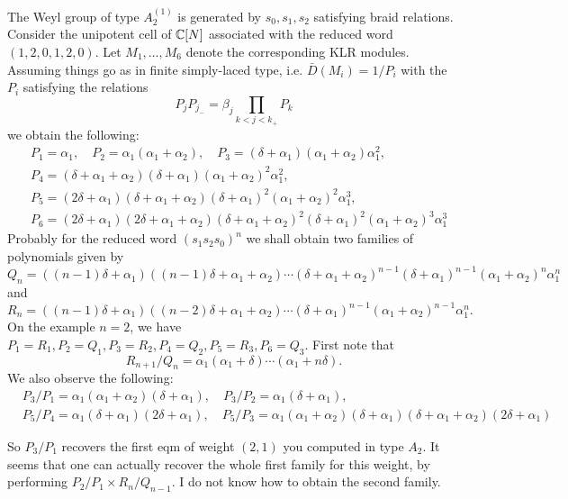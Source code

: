 \documentclass[11pt]{article}
\begin{document}
The Weyl group of type $A_2^{(1)}$ is generated by $s_0,s_1,s_2$ satisfying braid relations. 
Consider the unipotent cell of $\mathbb{C}[N]$ associated with the reduced word $(1,2,0,1,2,0)$. Let $M_1, \ldots , M_6$ denote the corresponding KLR modules. Assuming things go as in finite simply-laced type, i.e. $\bar{D}(M_i) = 1/P_i$ with the $P_i$ satisfying the relations 
$$ P_j P_{j_{-}} = \beta_j \prod_{k < j < k_{+}} P_k $$
we obtain the following:
$$
\begin{aligned}
  & P_1 = \alpha_1 , \quad  P_2 = \alpha_1(\alpha_1 + \alpha_2) , \quad   P_3 = (\delta + \alpha_1)(\alpha_1 + \alpha_2)\alpha_1^2 , \\
  & P_4 = (\delta + \alpha_1 + \alpha_2)(\delta + \alpha_1)(\alpha_1 + \alpha_2)^{2}\alpha_1^2 , \\
  & P_5 = (2 \delta  + \alpha_1)(\delta + \alpha_1 + \alpha_2)(\delta + \alpha_1)^{2}(\alpha_1 + \alpha_2)^{2}\alpha_1^{3} , \\
  & P_6 = (2 \delta  + \alpha_1)(2 \delta + \alpha_1 + \alpha_2)(\delta + \alpha_1 + \alpha_2)^{2}(\delta + \alpha_1)^{2}(\alpha_1 + \alpha_2)^{3}\alpha_1^{3}
\end{aligned}
$$
Probably for the reduced word $(s_1s_2s_0)^n$ we shall obtain two families of polynomials given by 
$$ Q_n = ((n-1) \delta  + \alpha_1)((n-1) \delta + \alpha_1 + \alpha_2) \cdots (\delta + \alpha_1 + \alpha_2)^{n-1}(\delta + \alpha_1)^{n-1}(\alpha_1 + \alpha_2)^{n}\alpha_1^{n} $$
and 
$$ R_n = ((n-1) \delta  + \alpha_1)((n-2) \delta + \alpha_1 + \alpha_2) \cdots (\delta + \alpha_1)^{n-1}(\alpha_1 + \alpha_2)^{n-1}\alpha_1^{n} . $$
On the example $n=2$, we have $P_1=R_1, P_2=Q_1, P_3=R_2, P_4=Q_2, P_5=R_3, P_6=Q_3$.
First note that 
$$ R_{n+1} / Q_n = \alpha_1(\alpha_1 + \delta) \cdots (\alpha_1 + n \delta) . $$
We also observe the following:
$$   
\begin{aligned}
  & P_3 / P_{1} = \alpha_1(\alpha_1 + \alpha_2)(\delta + \alpha_1), \quad  P_3 / P_2 = \alpha_1(\delta + \alpha_1), \\
  & P_5 / P_4 = \alpha_1(\delta + \alpha_1)(2 \delta + \alpha_1), \quad  P_5 / P_3 = \alpha_1(\alpha_1 + \alpha_2)(\delta + \alpha_1)(\delta + \alpha_1 + \alpha_2)(2 \delta + \alpha_1)
\end{aligned}
$$    
     
So $P_3 / P_1$ recovers the first eqm of weight $(2,1)$ you computed in type $A_2$. It seems that one can actually recover the whole first family for this weight, by performing $P_2 / P_1 \times R_n / Q_{n-1}$. I do not know how to obtain the second family. 
\end{document}
